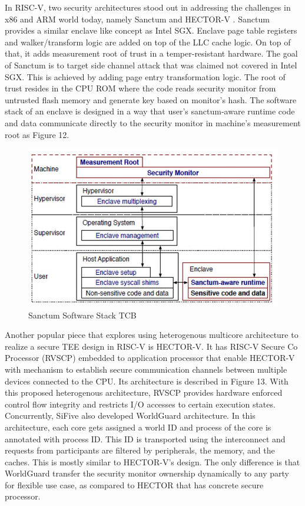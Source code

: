 \documentclass[]{rsos}%
\begin{document}
In RISC-V, two security architectures stood out in addressing the challenges in x86 and ARM world today, namely Sanctum \cite{R5:6} and HECTOR-V \cite{R5:5}. Sanctum provides a similar enclave like concept as Intel SGX. Enclave page table registers and walker/transform logic are added on top of the LLC cache logic. On top of that, it adds measurement root of trust in a temper-resistant hardware. The goal of Sanctum is to target side channel attack that was claimed not covered in Intel SGX. This is achieved by adding page entry transformation logic. The root of trust resides in the CPU ROM where the code reads security monitor from untrusted flash memory and generate key based on monitor’s hash. The software stack of an enclave is designed in a way that user’s sanctum-aware runtime code and data communicate directly to the security monitor in machine’s measurement root as Figure 12.

\begin{figure}[hbt!]
	\centering
	\includegraphics[width=1\textwidth]{figs/SanctumSwStack.JPG}
	\caption{Sanctum Software Stack TCB  \cite{R5:5}}
\end{figure}

Another popular piece that explores using heterogenous multicore architecture to realize a secure TEE design in RISC-V is HECTOR-V. It has RISC-V Secure Co Processor (RVSCP) embedded to application processor that enable HECTOR-V with mechanism to establish secure communication channels between multiple devices connected to the CPU. Its architecture is described in Figure 13. With this proposed heterogenous architecture, RVSCP provides hardware enforced control flow integrity and restricts I/O accesses to certain execution states. Concurrently, SiFive also developed WorldGuard architecture. In this architecture, each core gets assigned a world ID and process of the core is annotated with process ID. This ID is transported using the interconnect and requests from participants are filtered by peripherals, the memory, and the caches. This is mostly similar to HECTOR-V’s design. The only difference is that WorldGuard transfer the security monitor ownership dynamically to any party for flexible use case, as compared to HECTOR that has concrete secure processor.
\end{document}
